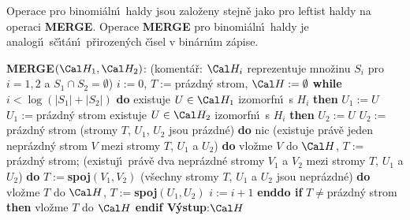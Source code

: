 \flushpar Operace pro binomi\'aln\'\i\ haldy jsou zalo\v zeny 
stejn\v e jako pro leftist haldy na operaci {\bf MER\-GE}. Operace 
{\bf MERGE} pro binomi\'aln\'\i\ haldy je analogi\'\i\ s\v c\'\i t\'an\'\i\ 
p\v rirozen\'ych \v c\'\i sel v bin\'ar\-n\'\i m z\'apise.
\bigskip

{\bf MERGE$\left(\Cal H_1,\Cal H_2\right)$}:\newline 
(koment\'a\v r: $\Cal H_i$ reprezentuje mno\v zinu $S_i$ pro $i=1
,2$ a $S_1\cap S_2=\emptyset$)\newline 
$i:=0$, $T:=$pr\'azdn\'y strom, $\Cal H:=\emptyset$\newline 
{\bf while} $i<\log\left(|S_1|+|S_2|\right)$ {\bf do}\newline 
\phantom{---}{\bf if} existuje $U\in \Cal H_1$ izomorfn\'\i\ s $H_i$ {\bf then}\newline 
\phantom{------}$U_1:=U$\newline 
\phantom{---}{\bf else}\newline
\phantom{------}$U_1:=$pr\'azdn\'y strom\newline 
\phantom{---}{\bf endif}\newline 
\phantom{---}{\bf if} existuje $U\in \Cal H_2$ izomorfn\'\i\ s $H_i$ {\bf then}\newline 
\phantom{------}$U_2:=U$\newline 
\phantom{---}{\bf else}\newline 
\phantom{------}$U_2:=$pr\'azdn\'y strom\newline 
\phantom{---}{\bf endif}\newline 
\phantom{---}{\bf case}\newline
\phantom{------}(stromy $T$, $U_1$, $U_2$ jsou pr\'azdn\'e) {\bf do}\newline 
\phantom{------}nic\newline 
\phantom{------}(existuje pr\'av\v e jeden nepr\'azdn\'y strom $V$ mezi stromy $T$, $U_1$ a $U_2$) {\bf do}\newline 
\phantom{------}vlo\v zme $V$ do $\Cal H$, $T:=$pr\'azdn\'y strom;\newline 
\phantom{------}(existuj\'\i\ pr\'av\v e dva nepr\'azdn\'e stromy $V_1$ a $V_2$ mezi stromy $T$, $U_1$ a $U_2$) {\bf do}\newline 
\phantom{------}$T:=${\bf spoj$\left(V_1,V_2\right)$}\newline 
\phantom{------}(v\v sechny stromy $T$, $U_1$ a $U_2$ jsou nepr\'azdn\'e)
{\bf do}\newline 
\phantom{------}vlo\v zme $T$ do $\Cal H$, $T:=${\bf spoj$\left(U_1,U_2\right)$}\newline 
\phantom{---}{\bf endcase}\newline
\phantom{---}$i:=i+1$\newline 
{\bf enddo\newline 
if} $T\ne$pr\'azdn\'y strom {\bf then} vlo\v zme $T$ do $\Cal H$ {\bf endif\newline 
V\'ystup}:$\Cal H$
\bigskip

